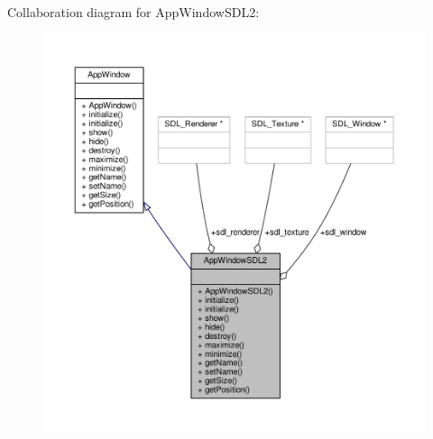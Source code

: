 Collaboration diagram for App\-Window\-S\-D\-L2\-:
\nopagebreak
\begin{figure}[H]
\begin{center}
\leavevmode
\includegraphics[width=350pt]{classAppWindowSDL2__coll__graph}
\end{center}
\end{figure}

